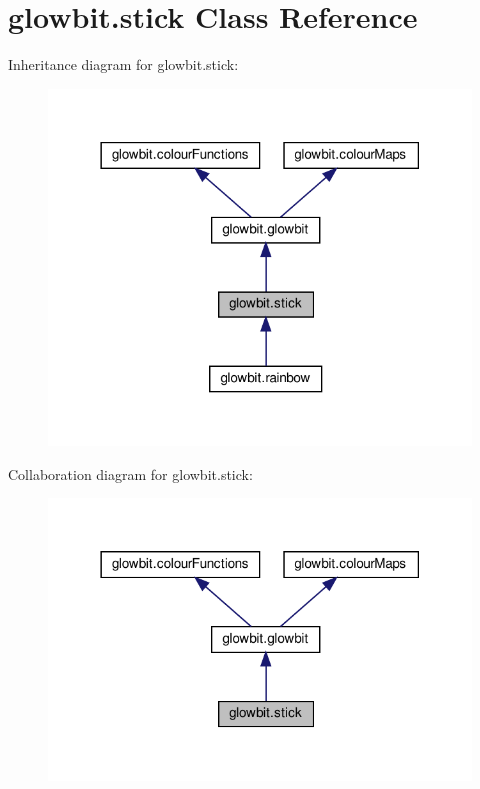\hypertarget{classglowbit_1_1stick}{}\section{glowbit.\+stick Class Reference}
\label{classglowbit_1_1stick}


Inheritance diagram for glowbit.\+stick\+:\nopagebreak
\begin{figure}[H]
\begin{center}
\leavevmode
\includegraphics[width=318pt]{classglowbit_1_1stick__inherit__graph}
\end{center}
\end{figure}


Collaboration diagram for glowbit.\+stick\+:\nopagebreak
\begin{figure}[H]
\begin{center}
\leavevmode
\includegraphics[width=318pt]{classglowbit_1_1stick__coll__graph}
\end{center}
\end{figure}
